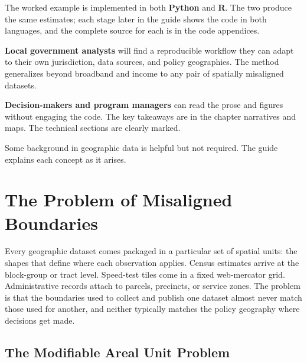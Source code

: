 \documentclass[
  letterpaper,
  DIV=11,
  numbers=noendperiod]{scrreprt}
\begin{document}
The worked example is implemented in both \textbf{Python} and
\textbf{R}. The two produce the same estimates; each stage later in the
guide shows the code in both languages, and the complete source for each
is in the code appendices.

\begin{tcolorbox}[enhanced jigsaw, rightrule=.15mm, leftrule=.75mm, arc=.35mm, title=\textcolor{quarto-callout-note-color}{\faInfo}\hspace{0.5em}{Who this guide is for}, opacityback=0, bottomtitle=1mm, opacitybacktitle=0.6, titlerule=0mm, breakable, coltitle=black, toptitle=1mm, colback=white, colframe=quarto-callout-note-color-frame, bottomrule=.15mm, toprule=.15mm, colbacktitle=quarto-callout-note-color!10!white, left=2mm]

\textbf{Local government analysts} will find a reproducible workflow
they can adapt to their own jurisdiction, data sources, and policy
geographies. The method generalizes beyond broadband and income to any
pair of spatially misaligned datasets.

\textbf{Decision-makers and program managers} can read the prose and
figures without engaging the code. The key takeaways are in the chapter
narratives and maps. The technical sections are clearly marked.

Some background in geographic data is helpful but not required. The
guide explains each concept as it arises.

\end{tcolorbox}


\chapter{The Problem of Misaligned Boundaries}\label{sec-maup}

Every geographic dataset comes packaged in a particular set of spatial
units: the shapes that define where each observation applies. Census
estimates arrive at the block-group or tract level. Speed-test tiles
come in a fixed web-mercator grid. Administrative records attach to
parcels, precincts, or service zones. The problem is that the boundaries
used to collect and publish one dataset almost never match those used
for another, and neither typically matches the policy geography where
decisions get made.

\section{The Modifiable Areal Unit
Problem}\label{the-modifiable-areal-unit-problem}
\end{document}
